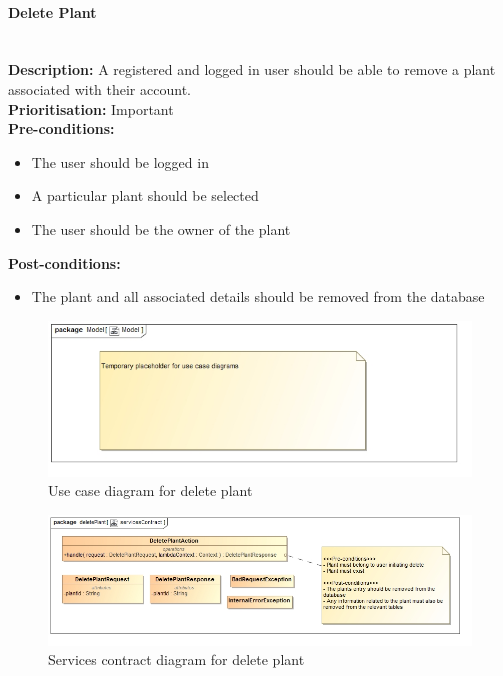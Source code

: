 \documentclass{article}
\begin{document}
	\paragraph{Delete Plant}\mbox{}\\
		\textbf{Description:} A registered and logged in user should be able to remove a plant associated with their account.\\
		\textbf{Prioritisation:} Important\\		
		\textbf{Pre-conditions:}
			\begin{itemize}
				\item The user should be logged in
				\item A particular plant should be selected
				\item The user should be the owner of the plant
			\end{itemize}
		\textbf{Post-conditions:}
			\begin{itemize}
				\item The plant and all associated details should be removed from the database
			\end{itemize}

		\begin{figure}[H]
			\includegraphics[width=\linewidth]{images/tempUseCase.jpg}
			\caption{Use case diagram for delete plant}
		\end{figure}
		
		\begin{figure}[H]
			\includegraphics[width=\linewidth]{images/ServicesContracts/deletePlant.jpg}
			\caption{Services contract diagram for delete plant}
		\end{figure}
	
\end{document}
